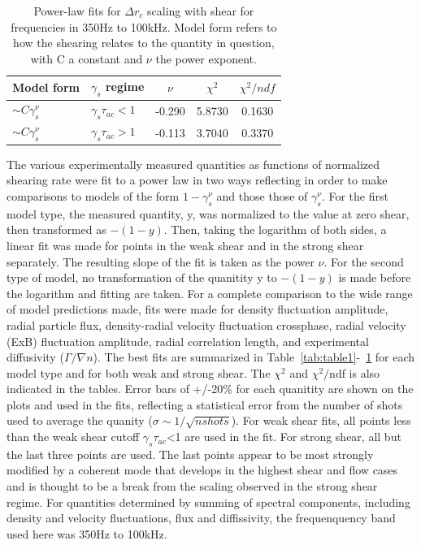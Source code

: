 \documentclass[aip,pop,amsmath,amssymb,reprint,superscriptaddress]{revtex4-1} %
\begin{document}
\begin{table}
\caption{\label{tab:table6}Power-law fits for $\Delta r_{c}$ scaling with shear for frequencies in 350Hz to 100kHz. Model form refers to how the shearing relates to the quantity in question, with C a constant and $\nu$ the power exponent.}
\begin{ruledtabular}
\begin{tabular}{llccc}
Model form&$\gamma_{s}$ regime&$\nu$&$\chi^2$&$\chi^2/ndf$\\
\hline
$\sim C\gamma_{s}^\nu$&$\gamma_{s}\tau_{ac}<1$ &-0.290 &5.8730 &0.1630\\
$\sim C\gamma_{s}^\nu$&$\gamma_{s}\tau_{ac}>1$ &-0.113 &3.7040 &0.3370\\
\end{tabular}
\end{ruledtabular}
\end{table}

The various experimentally measured quantities as functions of normalized shearing rate were fit to a power law in two ways reflecting in order to make comparisons to models of the form $1-\gamma_{s}^{\nu}$ and those those of $\gamma_{s}^{\nu}$. For the first model type, the measured quantity, y, was normalized to the value at zero shear, then transformed as $-(1-y)$. Then, taking the logarithm of both sides, a linear fit was made for points in the weak shear and in the strong shear separately. The resulting slope of the fit is taken as the power $\nu$. For the second type of model, no transformation of the quanitity y to $-(1-y)$ is made before the logarithm and fitting are taken. For a complete comparison to the wide range of model predictions made, fits were made for density fluctuation amplitude, radial particle flux, density-radial velocity fluctuation crossphase, radial velocity (ExB) fluctuation amplitude, radial correlation length, and experimental diffusivity ($\Gamma/\nabla n$). The best fits are summarized in Table~\ref{tab:table1}-~\ref{tab:table6} for each model type and for both weak and strong shear. The $\chi^{2}$ and $\chi^{2}/$ndf is also indicated in the tables.  Error bars of +/-20\% for each quanitity are shown on the plots and used in the fits, reflecting a statistical error from the number of shots used to average the quanity ($\sigma \sim 1/\sqrt{nshots}$). For weak shear fits, all points less than the weak shear cutoff $\gamma_{s}\tau_{ac}$<1 are used in the fit. For strong shear, all but the last three points are used. The last points appear to be most strongly modified by a coherent mode that develops in the highest shear and flow cases and is thought to be a break from the scaling observed in the strong shear regime. For quantities determined by summing of spectral components, including density and velocity fluctuations, flux and diffissivity, the frequenquency band used here was 350Hz to 100kHz.
\end{document}
